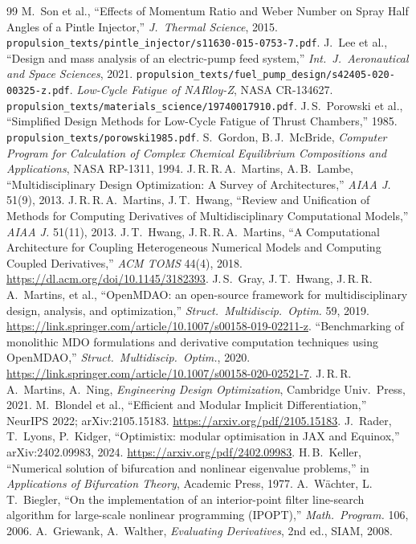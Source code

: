 \documentclass[11pt]{article}
\newcommand{\cmd}[1]{\nolinkurl{#1}}
\begin{document}
\begin{thebibliography}{99}
 M.\ Son et al., ``Effects of Momentum Ratio and Weber Number on
Spray Half Angles of a Pintle Injector,'' \emph{J.\ Thermal Science}, 2015.
\cmd{propulsion\_texts/pintle\_injector/s11630-015-0753-7.pdf}.
 J.\ Lee et al., ``Design and mass analysis of an electric-pump
feed system,'' \emph{Int.\ J.\ Aeronautical and Space Sciences}, 2021.
\cmd{propulsion\_texts/fuel\_pump\_design/s42405-020-00325-z.pdf}.
 \emph{Low-Cycle Fatigue of NARloy-Z}, NASA CR-134627.
\cmd{propulsion\_texts/materials\_science/19740017910.pdf}.
 J.\,S.\ Porowski et al., ``Simplified Design Methods for
Low-Cycle Fatigue of Thrust Chambers,'' 1985.
\cmd{propulsion\_texts/porowski1985.pdf}.
 S.\ Gordon, B.\,J.\ McBride, \emph{Computer Program for
Calculation of Complex Chemical Equilibrium Compositions and Applications},
NASA RP-1311, 1994.
 J.\,R.\,R.\,A.\ Martins, A.\,B.\ Lambe,
``Multidisciplinary Design Optimization: A Survey of Architectures,'' \emph{AIAA
J.} 51(9), 2013.
 J.\,R.\,R.\,A.\ Martins, J.\,T.\ Hwang, ``Review and
Unification of Methods for Computing Derivatives of Multidisciplinary
Computational Models,'' \emph{AIAA J.} 51(11), 2013.
 J.\,T.\ Hwang, J.\,R.\,R.\,A.\ Martins, ``A
Computational Architecture for Coupling Heterogeneous Numerical Models and
Computing Coupled Derivatives,'' \emph{ACM TOMS} 44(4), 2018.
\url{https://dl.acm.org/doi/10.1145/3182393}.
 J.\,S.\ Gray, J.\,T.\ Hwang, J.\,R.\,R.\,A.\ Martins, et al.,
``OpenMDAO: an open-source framework for multidisciplinary design, analysis, and
optimization,'' \emph{Struct.\ Multidiscip.\ Optim.} 59, 2019.
\url{https://link.springer.com/article/10.1007/s00158-019-02211-z}.
 ``Benchmarking of monolithic MDO formulations and
derivative computation techniques using OpenMDAO,'' \emph{Struct.\ Multidiscip.\
Optim.}, 2020.
\url{https://link.springer.com/article/10.1007/s00158-020-02521-7}.
\bibitem{martinsNing2021} J.\,R.\,R.\,A.\ Martins, A.\ Ning, \emph{Engineering
Design Optimization}, Cambridge Univ.\ Press, 2021.
 M.\ Blondel et al., ``Efficient and Modular Implicit
Differentiation,'' NeurIPS 2022; arXiv:2105.15183.
\url{https://arxiv.org/pdf/2105.15183}.
 J.\ Rader, T.\ Lyons, P.\ Kidger, ``Optimistix: modular
optimisation in JAX and Equinox,'' arXiv:2402.09983, 2024.
\url{https://arxiv.org/pdf/2402.09983}.
 H.\,B.\ Keller, ``Numerical solution of bifurcation and
nonlinear eigenvalue problems,'' in \emph{Applications of Bifurcation Theory},
Academic Press, 1977.
 A.\ W\"achter, L.\,T.\ Biegler, ``On the implementation of
an interior-point filter line-search algorithm for large-scale nonlinear
programming (IPOPT),'' \emph{Math.\ Program.} 106, 2006.
 A.\ Griewank, A.\ Walther, \emph{Evaluating Derivatives},
2nd ed., SIAM, 2008.
\end{thebibliography}
\end{document}
